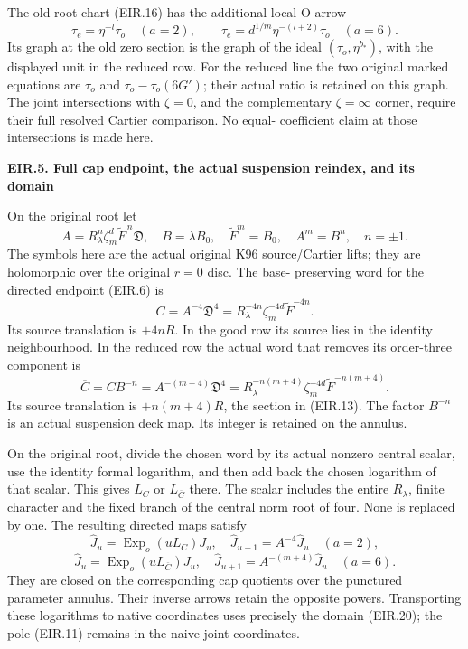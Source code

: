 The old-root chart (EIR.16) has the additional local O-arrow
\[
 \tau_e=\eta^{-l}\tau_o\quad(a=2),\qquad
 \tau_e=d^{1/m}\eta^{-(l+2)}\tau_o\quad(a=6).
 \tag{EIR.22}
\]
Its graph at the old zero section is the graph of the ideal
\((\tau_o,\eta^{b_*})\), with the displayed unit in the reduced
row. For the reduced line the two original marked equations are
\(\tau_o\) and \(\tau_o-\tau_o(6G')\); their actual ratio is
retained on this graph. The joint intersections with
\(\zeta=0\), and the complementary \(\zeta=\infty\) corner,
require their full resolved Cartier comparison. No equal-
coefficient claim at those intersections is made here.

\par

\medskip\noindent\textbf{EIR.5. Full cap endpoint, the actual suspension reindex, and its domain}

\par\nobreak

On the original root let
\[
 A=R_\lambda^n\zeta_m^d\widetilde F^{\,n}\mathfrak D,
 \quad B=\lambda B_0,\quad
 \widetilde F^m=B_0,\quad A^m=B^n,
 \quad n=\pm1.
 \tag{EIR.23}
\]
The symbols here are the actual original K96 source/Cartier lifts;
they are holomorphic over the original \(r=0\) disc. The base-
preserving word for the directed endpoint (EIR.6) is
\[
 C=A^{-4}\mathfrak D^4
   =R_\lambda^{-4n}\zeta_m^{-4d}\widetilde F^{-4n}.
 \tag{EIR.24}
\]
Its source translation is \(+4nR\). In the good row its source
lies in the identity neighbourhood. In the reduced row the
actual word that removes its order-three component is
\[
 \overline C=C B^{-n}
       =A^{-(m+4)}\mathfrak D^4
       =R_\lambda^{-n(m+4)}\zeta_m^{-4d}
                                  \widetilde F^{-n(m+4)}.
 \tag{EIR.25}
\]
Its source translation is \(+n(m+4)R\), the section in
(EIR.13). The factor \(B^{-n}\) is an actual suspension deck
map. Its integer is retained on the annulus.

On the original root, divide the chosen word by its actual nonzero
central scalar, use the identity formal logarithm, and then add
back the chosen logarithm of that scalar. This gives
\(L_C\) or \(L_{\overline C}\) there. The scalar includes the
entire \(R_\lambda\), finite character and the fixed branch of
the central norm root of four. None is replaced by one.
The resulting directed maps satisfy
\[
 \widehat J_u=\operatorname{Exp}_o(uL_C)J_u,
 \quad \widehat J_{u+1}=A^{-4}\widehat J_u\quad(a=2),
\]
\[
 \widehat J_u=\operatorname{Exp}_o(uL_{\overline C})J_u,
 \quad \widehat J_{u+1}=A^{-(m+4)}\widehat J_u\quad(a=6).
 \tag{EIR.26}
\]
They are closed on the corresponding cap quotients over the
punctured parameter annulus. Their inverse arrows retain the
opposite powers. Transporting these logarithms to native coordinates
uses precisely the domain (EIR.20); the pole (EIR.11) remains in
the naive joint coordinates.

